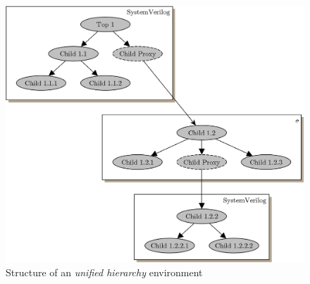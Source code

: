 \begin{figure}[htb]
 \centering
 \includegraphics[scale=0.3]{abb/UVM_ML_unified}
 \caption{Structure of an \emph{unified hierarchy} environment}
\label{fig:UVM_ML_unified}
\end{figure}

